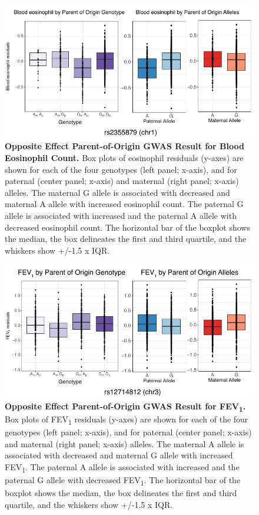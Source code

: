 \begin{figure}[!htb]
\centering
\includegraphics[width=5in]{img/ch02/fig-s12.pdf}
\caption[Opposite Effect Parent-of-Origin GWAS Result for Blood Eosinophil Count.]{\textbf{Opposite Effect Parent-of-Origin GWAS Result for Blood Eosinophil Count.}  Box plots of eosinophil residuals (y-axes) are shown for each of the four genotypes (left panel; x-axis), and for paternal (center panel; x-axis) and maternal (right panel; x-axis) alleles. The maternal G allele is associated with decreased and maternal A allele with increased eosinophil count. The paternal G allele is associated with increased and the paternal A allele with decreased eosinophil count. The horizontal bar of the boxplot shows the median, the box delineates the first and third quartile, and the whiskers show +/-1.5 x IQR.}
\label{fig:fig-s12}
\end{figure}

\begin{figure}[!htb]
\centering
\includegraphics[width=5in]{img/ch02/fig-s13.pdf}
\caption[Opposite Effect Parent-of-Origin GWAS Result for FEV\textsubscript{1}.]{\textbf{Opposite Effect Parent-of-Origin GWAS Result for FEV\textsubscript{1}.} Box plots of FEV\textsubscript{1} residuals (y-axes) are shown for each of the four genotypes (left panel; x-axis), and for paternal (center panel; x-axis) and maternal (right panel; x-axis) alleles. The maternal A allele is associated with decreased and maternal G allele with increased FEV\textsubscript{1}. The paternal A allele is associated with increased and the paternal G allele with decreased FEV\textsubscript{1}. The horizontal bar of the boxplot shows the median, the box delineates the first and third quartile, and the whiskers show +/-1.5 x IQR.}
\label{fig:fig-s13}
\end{figure}

